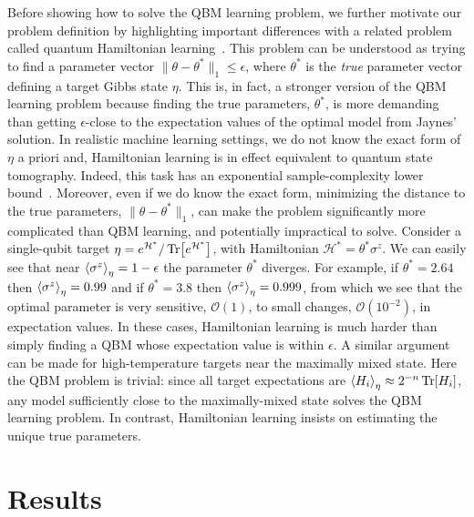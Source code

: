 \documentclass[
    aps,
    prx,
    onecolumn
]{revtex4-2}
\begin{document}
Before showing how to solve the QBM learning problem, we further motivate our problem definition by highlighting important differences with a related problem called quantum Hamiltonian learning~\cite{Wiebe_2014, franca2020, Anshu_2021, Haah_2022, Rouze_2023, Onorati_2023}. This problem can be understood as trying to find a parameter vector $\|\theta-\theta^*\|_1 \leq \epsilon$, where $\theta^*$ is the \emph{true} parameter vector defining a target Gibbs state $\eta$. This is, in fact, a stronger version of the QBM learning problem because finding the true parameters, $\theta^*$, is more demanding than getting $\epsilon$-close to the expectation values of the optimal model from Jaynes' solution. In realistic machine learning settings, we do not know the exact form of $\eta$ a priori and, Hamiltonian learning is in effect equivalent to quantum state tomography. Indeed, this task has an exponential sample-complexity lower bound~\cite{Aaronson_2017}. Moreover, even if we do know the exact form, minimizing the distance to the true parameters, $\|\theta-\theta^*\|_1$, can make the problem significantly more complicated than QBM learning, and potentially impractical to solve. Consider a single-qubit target $\eta = e^{\mathcal{H}^*} / \Tr[e^{\mathcal{H}^*}]$, with Hamiltonian $\mathcal{H}^*=\theta^* \sigma^z$. We can easily see that near $\expval{\sigma^z}_\eta=1-\epsilon$ the parameter $\theta^*$ diverges. For example, if $\theta^*=2.64$ then $\expval{\sigma^z}_\eta=0.99$ and if $\theta^*=3.8$ then $\expval{\sigma^z}_\eta=0.999$, from which we see that the optimal parameter is very sensitive, $\mathcal{O}(1)$, to small changes, $\mathcal{O}(10^{-2})$, in expectation values. In these cases, Hamiltonian learning is much harder than simply finding a QBM whose expectation value is within $\epsilon$. A similar argument can be made for high-temperature targets near the maximally mixed state. Here the QBM problem is trivial: since all target expectations are $\expval{H_i}_\eta \approx 2^{-n} \Tr[H_i]$, any model sufficiently close to the maximally-mixed state solves the QBM learning problem. In contrast, Hamiltonian learning insists on estimating the unique true parameters.

\section*{Results}
\end{document}
